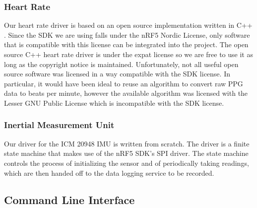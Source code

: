 \subsubsection{Heart Rate}

Our heart rate driver is based on an open source implementation written in
C++ \cite{max86150-ardino}. Since the SDK we are using falls under the nRF5
Nordic License, only software that is compatible with this license can be
integrated into the project. The open source C++ heart rate driver is under the
expat license so we are free to use it as long as the copyright notice is
maintained. Unfortunately, not all useful open source software was licensed in
a way compatible with the SDK license. In particular, it would have been ideal
to reuse an algorithm to convert raw PPG data to beats per minute, however the
available algorithm was licensed with the Lesser GNU Public
License \cite{wasp-os} which is incompatible with the SDK license.

\subsubsection{Inertial Measurement Unit}

Our driver for the ICM 20948 IMU is written from scratch. The driver is a finite
state machine that makes use of the nRF5 SDK's SPI driver. The state machine
controls the process of initializing the sensor and of periodically taking
readings, which are then handed off to the data logging service to be recorded.


\subsection{Command Line Interface}


